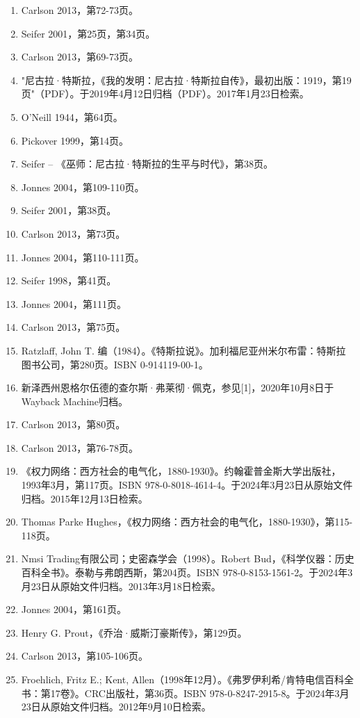 \begin{enumerate}
\item Carlson 2013，第72-73页。  
\item Seifer 2001，第25页，第34页。  
\item Carlson 2013，第69-73页。  
\item "尼古拉·特斯拉，《我的发明：尼古拉·特斯拉自传》，最初出版：1919，第19页"（PDF）。于2019年4月12日归档（PDF）。2017年1月23日检索。  
\item O'Neill 1944，第64页。  
\item Pickover 1999，第14页。  
\item Seifer – 《巫师：尼古拉·特斯拉的生平与时代》，第38页。  
\item Jonnes 2004，第109-110页。  
\item Seifer 2001，第38页。  
\item Carlson 2013，第73页。
\item Jonnes 2004，第110-111页。  
\item Seifer 1998，第41页。  
\item Jonnes 2004，第111页。  
\item Carlson 2013，第75页。  
\item Ratzlaff, John T. 编（1984）。《特斯拉说》。加利福尼亚州米尔布雷：特斯拉图书公司，第280页。ISBN 0-914119-00-1。  
\item 新泽西州恩格尔伍德的查尔斯·弗莱彻·佩克，参见[1]，2020年10月8日于Wayback Machine归档。  
\item Carlson 2013，第80页。  
\item Carlson 2013，第76-78页。  
\item 《权力网络：西方社会的电气化，1880-1930》。约翰霍普金斯大学出版社，1993年3月，第117页。ISBN 978-0-8018-4614-4。于2024年3月23日从原始文件归档。2015年12月13日检索。  
\item Thomas Parke Hughes，《权力网络：西方社会的电气化，1880-1930》，第115-118页。  
\item Nmsi Trading有限公司；史密森学会（1998）。Robert Bud，《科学仪器：历史百科全书》。泰勒与弗朗西斯，第204页。ISBN 978-0-8153-1561-2。于2024年3月23日从原始文件归档。2013年3月18日检索。
\item Jonnes 2004，第161页。  
\item Henry G. Prout，《乔治·威斯汀豪斯传》，第129页。  
\item Carlson 2013，第105-106页。  
\item Froehlich, Fritz E.; Kent, Allen（1998年12月）。《弗罗伊利希/肯特电信百科全书：第17卷》。CRC出版社，第36页。ISBN 978-0-8247-2915-8。于2024年3月23日从原始文件归档。2012年9月10日检索。  

\end{enumerate}
